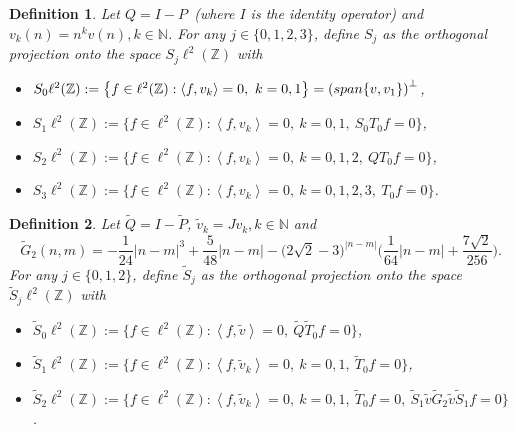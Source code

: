 \documentclass[10pt,a4paper]{amsart}
\newtheorem{definition}{Definition}[section]
\newcommand\Z{\mathbb{Z}}
\newcommand\N{\mathbb{N}}
\numberwithin{equation}{section}
\begin{document}
\setcounter{section}{1}
\setcounter{equation}{19}
\setcounter{definition}{3}
\begin{definition}\label{definition of Sj}
Let $Q=I-P$~{\rm(}where $I$ is the identity operator{\rm)} and $v_k(n)=n^kv(n),k\in\N$. For any $j\in\{0,1,2,3\}$, define $S_j$ as the orthogonal projection onto the space $S_j\ell^2(\Z)$ with
\begin{itemize}
\item[{\rm(i)}]$S_0\ell^2(\Z):=\big\{f\in\ell^2(\Z):\left<f,v_{k}\right>=0,\ k=0,1\big\}=\left({\rm span}\{v,v_1\}\right)^{\bot}$,
\item[{\rm(ii)}]$S_1\ell^2(\Z):=\big\{f\in\ell^2(\Z):\left<f,v_{k}\right>=0,\ k=0,1,\ S_0T_0f=0\big\}$,
\item[{\rm(iii)}] $S_2\ell^2(\Z):=\big\{f\in\ell^2(\Z):\left<f,v_{k}\right>=0,\ k=0,1,2,\ QT_0f=0\big\}$,
\item[{\rm(iv)}] $S_3\ell^2(\Z):=\big\{f\in\ell^2(\Z):\left<f,v_{k}\right>=0,\ k=0,1,2,3,\ T_0f=0\big\}$.
\end{itemize}
\end{definition}
\begin{definition}\label{definition of Sjtilde}
Let $\widetilde{Q}=I-\widetilde{P}$, $\tilde{v}_k=Jv_k,k\in\N$ and 
$$\widetilde{G}_{2}(n,m)=-\frac{1}{24}|n-m|^3+\frac{5}{48}|n-m|-\big(2\sqrt2-3\big)^{|n-m|}\Big(\frac{1}{64}|n-m|+\frac{7\sqrt{2}}{256}\Big).$$
For any $j\in\{0,1,2\}$, define $\widetilde{S}_j$ as the orthogonal projection onto the space $\widetilde{S}_j\ell^2(\Z)$ with
\begin{itemize}
\item[{\rm(i)}]$\widetilde{S}_0\ell^2(\Z):=\big\{f\in\ell^2(\Z):\left<f,\tilde{v}\right>=0,\ \widetilde{Q}\widetilde{T}_0f=0\big\}$,
\item[{\rm(ii)}]$\widetilde{S}_1\ell^2(\Z):=\big\{f\in\ell^2(\Z):\left<f,\tilde{v}_k\right>=0,\ k=0,1,\ \widetilde{T}_0f=0\big\}$,
\item[{\rm(iii)}]$\widetilde{S}_2\ell^2(\Z):=\big\{f\in\ell^2(\Z):\left<f,\tilde{v}_k\right>=0,\ k=0,1,\ \widetilde{T}_0f=0,\ \widetilde{S}_1\tilde{v}\widetilde{G}_2\tilde{v}\widetilde{S}_1f=0\big\}$.
\end{itemize}
\end{definition}
\end{document}
